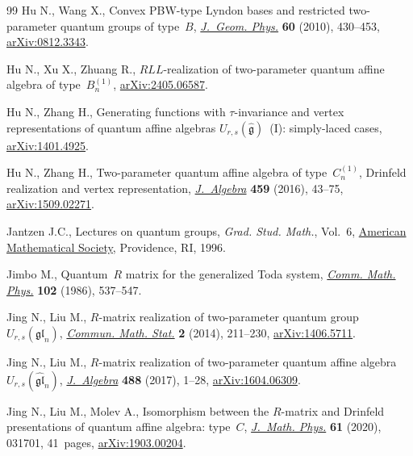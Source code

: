 \documentclass[10pt,a4paper]{amsart}
\numberwithin{equation}{section}
\begin{document}
\begin{thebibliography}{99}
Hu N., Wang X., Convex {PBW}-type {L}yndon bases and restricted two-parameter
 quantum groups of type~{$B$},
 \href{https://doi.org/10.1016/j.geomphys.2009.11.005}{\textit{J.~Geom.
 Phys.}} \textbf{60} (2010), 430--453,
 \href{http://arxiv.org/abs/0812.3343}{arXiv:0812.3343}.

Hu N., Xu X., Zhuang R., $RLL$-realization of two-parameter quantum affine
 algebra of type~$B^{(1)}_n$,
 \href{http://arxiv.org/abs/2405.06587}{arXiv:2405.06587}.

Hu N., Zhang H., Generating functions with $\tau$-invariance and vertex
 representations of quantum affine algebras
 $U_{r,s}(\widehat{\mathfrak{g}})$~(I): simply-laced cases,
 \href{http://arxiv.org/abs/1401.4925}{arXiv:1401.4925}.

Hu N., Zhang H., Two-parameter quantum affine algebra of type~{$C^{(1)}_n$},
 {D}rinfeld realization and vertex representation,
 \href{https://doi.org/10.1016/j.jalgebra.2016.03.031}{\textit{J.~Algebra}}
 \textbf{459} (2016), 43--75,
 \href{http://arxiv.org/abs/1509.02271}{arXiv:1509.02271}.

Jantzen J.C., Lectures on quantum groups, \textit{Grad. Stud. Math.}, Vol.~6,
 \href{https://doi.org/10.1090/gsm/006}{American Mathematical Society},
 Providence, RI, 1996.

Jimbo M., Quantum~{$R$} matrix for the generalized {T}oda system,
 \href{https://doi.org/10.1007/BF01221646}{\textit{Comm. Math. Phys.}}
 \textbf{102} (1986), 537--547.

Jing N., Liu M., {$R$}-matrix realization of two-parameter quantum
 group~{$U_{r,s}(\mathfrak{gl}_n)$},
 \href{https://doi.org/10.1007/s40304-014-0037-7}{\textit{Commun. Math.
 Stat.}} \textbf{2} (2014), 211--230,
 \href{http://arxiv.org/abs/1406.5711}{arXiv:1406.5711}.

Jing N., Liu M., $R$-matrix realization of two-parameter quantum affine
 algebra~{$U_{r,s}(\widehat{\mathfrak{gl}}_n)$},
 \href{https://doi.org/10.1016/j.jalgebra.2017.05.028}{\textit{J.~Algebra}}
 \textbf{488} (2017), 1--28,
 \href{http://arxiv.org/abs/1604.06309}{arXiv:1604.06309}.

Jing N., Liu M., Molev A., Isomorphism between the {$R$}-matrix and {D}rinfeld
 presentations of quantum affine algebra: type~{$C$},
 \href{https://doi.org/10.1063/1.5133854}{\textit{J.~Math. Phys.}} \textbf{61}
 (2020), 031701, 41~pages,
 \href{http://arxiv.org/abs/1903.00204}{arXiv:1903.00204}.


\end{thebibliography}
\end{document}
